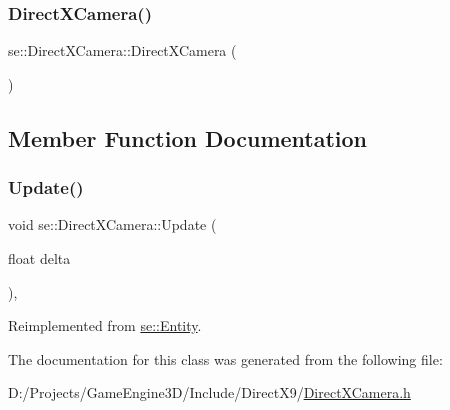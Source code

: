 \subsubsection{\texorpdfstring{Direct\+X\+Camera()}{DirectXCamera()}}
{\footnotesize\ttfamily se\+::\+Direct\+X\+Camera\+::\+Direct\+X\+Camera (\begin{DoxyParamCaption}{ }\end{DoxyParamCaption})}



\subsection{Member Function Documentation}
\mbox{\label{classse_1_1_direct_x_camera_ae313a5d5a4d2c1b88e5f40285b31b921}} 
\subsubsection{\texorpdfstring{Update()}{Update()}}
{\footnotesize\ttfamily void se\+::\+Direct\+X\+Camera\+::\+Update (\begin{DoxyParamCaption}\item[{float}]{delta }\end{DoxyParamCaption})\hspace{0.3cm}{\ttfamily [override]}, {\ttfamily [virtual]}}



Reimplemented from \mbox{\hyperlink{classse_1_1_entity_a1cd277c4c5a517f5cde8b72d5c40a8f0}{se\+::\+Entity}}.



The documentation for this class was generated from the following file\+:\begin{DoxyCompactItemize}
\item 
D\+:/\+Projects/\+Game\+Engine3\+D/\+Include/\+Direct\+X9/\mbox{\hyperlink{_direct_x_camera_8h}{Direct\+X\+Camera.\+h}}\end{DoxyCompactItemize}
